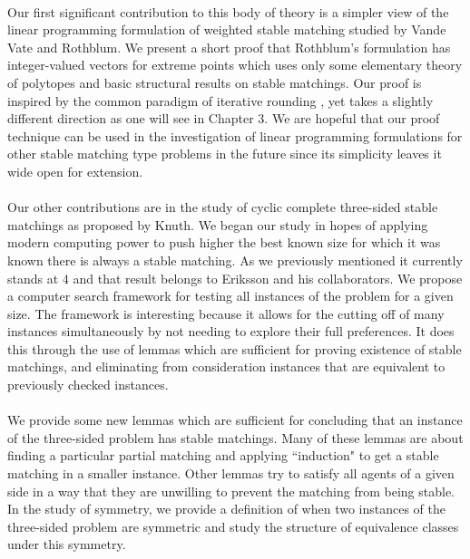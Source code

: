 \paragraph{}
Our first significant contribution to this body of theory is a simpler view of the linear programming formulation of weighted stable matching studied by Vande Vate and Rothblum. We present a short proof that Rothblum's formulation has integer-valued vectors for extreme points which uses only some elementary theory of polytopes and basic structural results on stable matchings. Our proof is inspired by the common paradigm of iterative rounding \cite{lau2011iterative}, yet takes a slightly different direction as one will see in Chapter $3$. We are hopeful that our proof technique can be used in the investigation of linear programming formulations for other stable matching type problems in the future since its simplicity leaves it wide open for extension.
\paragraph{}
Our other contributions are in the study of cyclic complete three-sided stable matchings as proposed by Knuth. We began our study in hopes of applying modern computing power to push higher the best known size for which it was known there is always a stable matching. As we previously mentioned it currently stands at $4$ and that result belongs to Eriksson and his collaborators. We propose a computer search framework for testing all instances of the problem for a given size. The framework is interesting because it allows for the cutting off of many instances simultaneously by not needing to explore their full preferences. It does this through the use of lemmas which are sufficient for proving existence of stable matchings, and eliminating from consideration instances that are equivalent to previously checked instances. 
\paragraph{}
We provide some new lemmas which are sufficient for concluding that an instance of the three-sided problem has stable matchings. Many of these lemmas are about finding a particular partial matching and applying ``induction" to get a stable matching in a smaller instance. Other lemmas try to satisfy all agents of a given side in a way that they are unwilling to prevent the matching from being stable. In the study of symmetry, we provide a definition of when two instances of the three-sided problem are symmetric and study the structure of equivalence classes under this symmetry.
